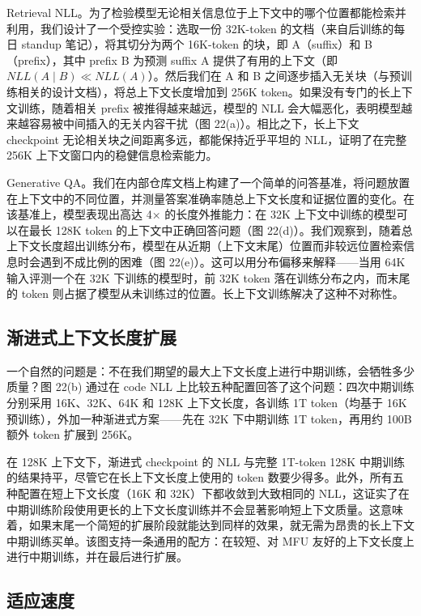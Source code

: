 \documentclass[
  10
]{article}
\begin{document}
Retrieval NLL。为了检验模型无论相关信息位于上下文中的哪个位置都能检索并利用，我们设计了一个受控实验：选取一份 32K-token 的文档（来自后训练的每日 standup 笔记），将其切分为两个 16K-token 的块，即 A（suffix）和 B（prefix），其中 prefix B 为预测 suffix A 提供了有用的上下文（即 $NLL(A \mid B) \ll NLL(A)$）。然后我们在 A 和 B 之间逐步插入无关块（与预训练相关的设计文档），将总上下文长度增加到 256K token。如果没有专门的长上下文训练，随着相关 prefix 被推得越来越远，模型的 NLL 会大幅恶化，表明模型越来越容易被中间插入的无关内容干扰（图 22(a)）。相比之下，长上下文 checkpoint 无论相关块之间距离多远，都能保持近乎平坦的 NLL，证明了在完整 256K 上下文窗口内的稳健信息检索能力。

Generative QA。我们在内部仓库文档上构建了一个简单的问答基准，将问题放置在上下文中的不同位置，并测量答案准确率随总上下文长度和证据位置的变化。在该基准上，模型表现出高达 4× 的长度外推能力：在 32K 上下文中训练的模型可以在最长 128K token 的上下文中正确回答问题（图 22(d)）。我们观察到，随着总上下文长度超出训练分布，模型在从近期（上下文末尾）位置而非较远位置检索信息时会遇到不成比例的困难（图 22(e)）。这可以用分布偏移来解释——当用 64K 输入评测一个在 32K 下训练的模型时，前 32K token 落在训练分布之内，而末尾的 token 则占据了模型从未训练过的位置。长上下文训练解决了这种不对称性。

\subsection{渐进式上下文长度扩展}\label{c.3-progressive-context-length-scaling}

一个自然的问题是：不在我们期望的最大上下文长度上进行中期训练，会牺牲多少质量？图 22(b) 通过在 code NLL 上比较五种配置回答了这个问题：四次中期训练分别采用 16K、32K、64K 和 128K 上下文长度，各训练 1T token（均基于 16K 预训练），外加一种渐进式方案——先在 32K 下中期训练 1T token，再用约 100B 额外 token 扩展到 256K。



在 128K 上下文下，渐进式 checkpoint 的 NLL 与完整 1T-token 128K 中期训练的结果持平，尽管它在长上下文长度上使用的 token 数要少得多。此外，所有五种配置在短上下文长度（16K 和 32K）下都收敛到大致相同的 NLL，这证实了在中期训练阶段使用更长的上下文长度训练并不会显著影响短上下文质量。这意味着，如果末尾一个简短的扩展阶段就能达到同样的效果，就无需为昂贵的长上下文中期训练买单。该图支持一条通用的配方：在较短、对 MFU 友好的上下文长度上进行中期训练，并在最后进行扩展。

\subsection{适应速度}\label{c.4-speed-of-adaptation}
\end{document}
